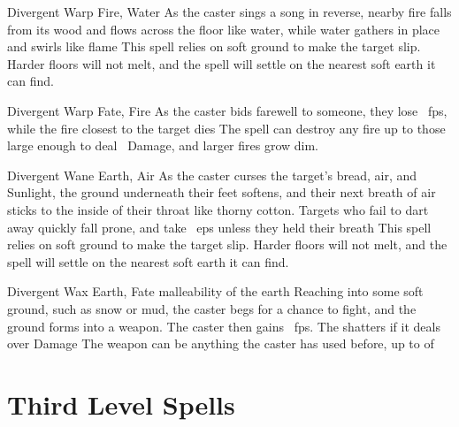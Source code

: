 \begin{multicols}{2}
  {Divergent}%
  {Warp}%
  {Fire, Water}%
  {}%
  {As the caster sings a song in reverse, nearby fire falls from its wood and flows across the floor like water, while water gathers in place and swirls like flame}%
  {
  This spell relies on soft ground to make the target slip.
  Harder floors will not melt, and the spell will settle on the nearest soft earth it can find.}

  {Divergent}%
  {Warp}%
  {Fate, Fire}%
  {}%
  {As the caster bids farewell to someone, they lose \showDam~\glspl{fp}, while the fire closest to the target dies}%
  {
  The spell can destroy any fire up to those large enough to deal \showDam\ Damage, and larger fires grow dim.}

  {Divergent}%
  {Wane}%
  {Earth, Air}%
  {}%
  {As the caster curses the target's bread, air, and Sunlight, the ground underneath their feet softens, and their next breath of air sticks to the inside of their throat like thorny cotton.
  Targets who fail to dart away quickly fall prone, and take ~\glspl{ep} unless they held their breath}%
  {
  This spell relies on soft ground to make the target slip.
  Harder floors will not melt, and the spell will settle on the nearest soft earth it can find.}

  {Divergent}%
  {Wax}%
  {Earth, Fate}%
  {malleability of the earth}%
  {Reaching into some soft ground, such as snow or mud, the caster begs for a chance to fight, and the ground forms into a weapon.
  The caster then gains ~\glspl{fp}.
  The shatters if it deals over  Damage}%
  {
  The weapon can be anything the caster has used before, up to  of }

\end{multicols}

\section{Third Level Spells}

